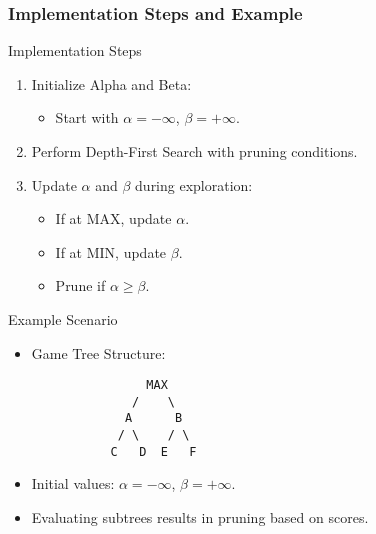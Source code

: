 \documentclass[aspectratio=169]{beamer}
\begin{document}
\begin{frame}[fragile]
    \frametitle{Implementation Steps and Example}
    \begin{block}{Implementation Steps}
        \begin{enumerate}
            \item Initialize Alpha and Beta:
            \begin{itemize}
                \item Start with \(\alpha = -\infty\), \(\beta = +\infty\).
            \end{itemize}
            \item Perform Depth-First Search with pruning conditions.
            \item Update \(\alpha\) and \(\beta\) during exploration:
            \begin{itemize}
                \item If at MAX, update \(\alpha\).
                \item If at MIN, update \(\beta\).
                \item Prune if \(\alpha \geq \beta\).
            \end{itemize}
        \end{enumerate}
    \end{block}
    
    \begin{block}{Example Scenario}
        \begin{itemize}
            \item Game Tree Structure:
            \begin{verbatim}
                MAX
              /    \
             A      B
            / \    / \
           C   D  E   F
            \end{verbatim}
            \item Initial values: \(\alpha = -\infty\), \(\beta = +\infty\).
            \item Evaluating subtrees results in pruning based on scores.
        \end{itemize}
    \end{block}
\end{frame}
\end{document}
